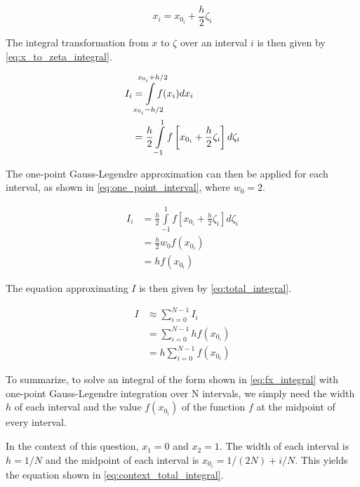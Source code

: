 \documentclass[a4paper,titlepage]{article}
\begin{document}
	\begin{equation} \label{eq:x_zeta}
		x_i = x_{0_i} + \frac{h}{2} \zeta_i
	\end{equation}
	
	The integral transformation from $x$ to $\zeta$ over an interval $i$ is then given by \cref{eq:x_to_zeta_integral}.
	
	\begin{equation} \label{eq:x_to_zeta_integral}
	\begin{split}
			I_i &= \smashoperator{\int\limits_{x_{0_i} - h/2}^{x_{0_i} + h/2}} f(x_i) dx_i \\
			 &= \frac{h}{2} \int\limits_{-1}^{1} f \left[x_{0_i} + \frac{h}{2} \zeta_i\right] d\zeta_i
	\end{split}
	\end{equation}
	
	The one-point Gauss-Legendre approximation can then be applied for each interval, as shown in \cref{eq:one_point_interval}, where $w_0 = 2$.
	
	\begin{equation} \label{eq:one_point_interval}
		\begin{split}
			I_i &= \frac{h}{2} \int\limits_{-1}^{1} f \left[x_{0_i} + \frac{h}{2} \zeta_i\right] d\zeta_i \\
			&= \frac{h}{2} w_0 f(x_{0_i}) \\
			&= h f(x_{0_i})
		\end{split}
	\end{equation}
	
	The equation approximating $I$ is then given by \cref{eq:total_integral}.
	
	\begin{equation} \label{eq:total_integral}
		\begin{split}
				I &\approx \sum_{i=0}^{N-1} I_i \\
				&= \sum_{i=0}^{N-1} h f(x_{0_i}) \\
				&= h \sum_{i=0}^{N-1} f(x_{0_i})
		\end{split}
	\end{equation}
	
	To summarize, to solve an integral of the form shown in \cref{eq:fx_integral} with one-point Gauss-Legendre integration over N intervals, we simply need the width $h$ of each interval and the value $f(x_{0_i})$ of the function $f$ at the midpoint of every interval.
	
	In the context of this question, $x_1 = 0$ and $x_2 = 1$. The width of each interval is $h = 1/N$ and the midpoint of each interval is $x_{0_i} = 1/(2N) + i/N$. This yields the equation shown in \cref{eq:context_total_integral}.
	
\end{document}
